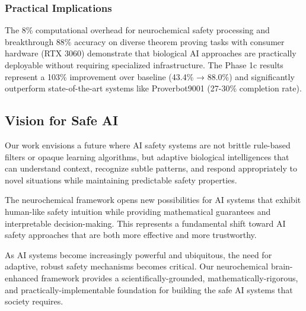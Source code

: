 \documentclass[12pt]{article}
\begin{document}
\subsubsection{Practical Implications}

The 8\% computational overhead for neurochemical safety processing and breakthrough 88\% accuracy on diverse theorem proving tasks with consumer hardware (RTX 3060) demonstrate that biological AI approaches are practically deployable without requiring specialized infrastructure. The Phase 1c results represent a 103\% improvement over baseline (43.4\% → 88.0\%) and significantly outperform state-of-the-art systems like Proverbot9001 (27-30\% completion rate).

\subsection{Vision for Safe AI}

Our work envisions a future where AI safety systems are not brittle rule-based filters or opaque learning algorithms, but adaptive biological intelligences that can understand context, recognize subtle patterns, and respond appropriately to novel situations while maintaining predictable safety properties.

The neurochemical framework opens new possibilities for AI systems that exhibit human-like safety intuition while providing mathematical guarantees and interpretable decision-making. This represents a fundamental shift toward AI safety approaches that are both more effective and more trustworthy.

As AI systems become increasingly powerful and ubiquitous, the need for adaptive, robust safety mechanisms becomes critical. Our neurochemical brain-enhanced framework provides a scientifically-grounded, mathematically-rigorous, and practically-implementable foundation for building the safe AI systems that society requires.
\end{document}
